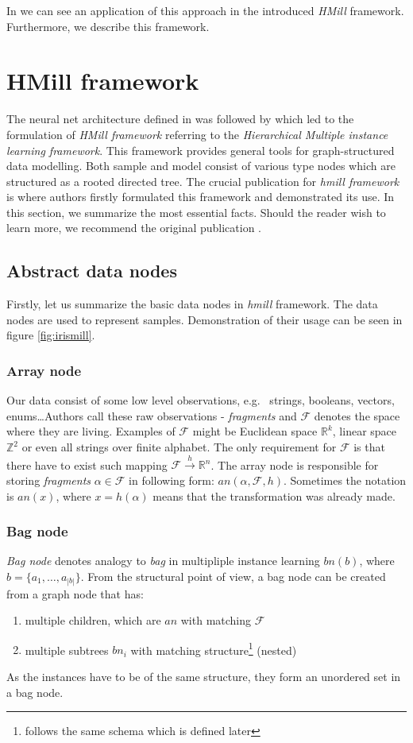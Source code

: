 In \cite{Mandlik2020} we can see an application of this approach in the introduced \emph{HMill} framework. Furthermore, we describe this framework.

\section{HMill framework}
The neural net architecture defined in \cite{Pevny2016a} was followed by \cite{Mandlik2020} which led to the formulation of \emph{HMill framework} referring to the \emph{Hierarchical Multiple instance learning framework}. This framework provides general tools for graph-structured data modelling. Both sample and model consist of various type nodes which are structured as a rooted directed tree. The crucial publication for \emph{hmill framework} is \cite{Mandlik2020} where authors firstly formulated this framework and demonstrated its use. In this section, we summarize the most essential facts. Should the reader wish to learn more, we recommend the original publication \cite{Mandlik2020}.

\subsection{Abstract data nodes}
Firstly, let us summarize the basic data nodes in \emph{hmill} framework. The data nodes are used to represent samples. Demonstration of their usage can be seen in figure \ref{fig:irismill}.
\subsubsection{Array node}
Our data consist of some low level observations, e.g. \ strings, booleans, vectors, enums\dots Authors call these raw observations - \emph{fragments} and $\mathcal{F}$ denotes the space where they are living. Examples of $\mathcal{F}$ might be Euclidean space $\mathbb{R}^{k}$, linear space $\mathbb{Z}^{2}$ or even all strings over finite alphabet. The only requirement for $\mathcal{F}$ is that there have to exist such mapping $\mathcal{F}\xrightarrow{h}\mathbb{R}^{n}$. The array node is responsible for storing \emph{fragments} $\alpha\in\mathcal{F}$ in following form: $an(\alpha,\mathcal{F},h)$. Sometimes the notation is $an(x)$, where $x=h(\alpha)$ means that the transformation was already made.

\subsubsection{Bag node}
\emph{Bag node} denotes analogy to \emph{bag} in multipliple instance learning $bn(b)$, where $b=\{a_1,\dots,a_{|b|}\}$. 
From the structural point of view, a bag node can be created from a graph node that has:
\begin{enumerate}
    \itemsep0em 
	\item multiple children, which are $an$ with matching $\mathcal{F}$
	\item multiple subtrees $bn_i$ with matching structure\footnote{follows the same schema which is defined later} (nested)
\end{enumerate}
As the instances have to be of the same structure, they form an unordered set in a bag node.

